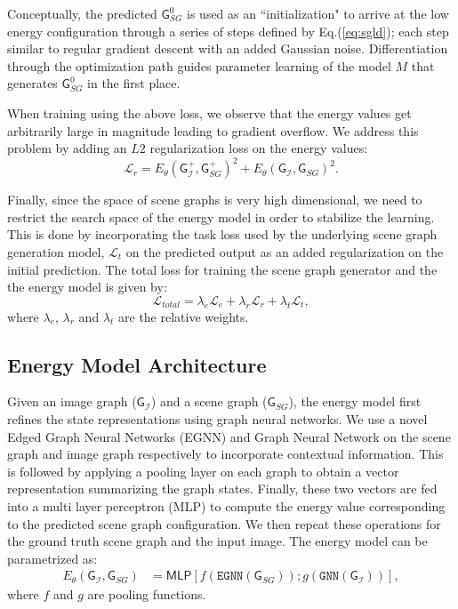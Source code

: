 \documentclass[final]{cvpr}
\newcommand{\imagerep}{\mathcal{I}}
\newcommand{\imagegraph}{$\mathsf{G}_{\imagerep}$}
\newcommand{\imagegrapheq}{\mathsf{G}_{\imagerep}}
\newcommand{\scenegraph}{$\mathsf{G}_{SG}$}
\newcommand{\scenegrapheq}{\mathsf{G}_{SG}}
\begin{document}
Conceptually, the predicted $\scenegrapheq^{0}$ is used as an ``initialization" to arrive at the low energy configuration through a series of steps defined by Eq.(\ref{eq:sgld}); each step similar to regular gradient descent with an added Gaussian noise. Differentiation through the optimization path guides parameter learning of the model $M$ that generates $\scenegrapheq^{0}$ in the first place. 



When training using the above loss, we observe that the energy values get arbitrarily large in magnitude leading to gradient overflow.  We address this problem by adding an $L2$ regularization loss on the energy values:
\begin{equation}
    \mathcal{L}_{r} = E_{\theta}(\imagegrapheq^{+}, \scenegrapheq^{+})^{2} + E_{\theta}(\imagegrapheq, \scenegrapheq)^{2}.
\end{equation}

Finally, since the space of scene graphs is very high dimensional, we need to restrict the search space of the energy model in order to stabilize the learning. This is done by incorporating the task loss used by the underlying scene graph generation model, $\mathcal{L}_{t}$ on the predicted output as an added regularization on the initial prediction. The total loss for training the scene graph generator and the the energy model is given by:
\begin{equation}
    \mathcal{L}_{total} = \lambda_{e}\mathcal{L}_{e} + \lambda_{r}\mathcal{L}_{r} + \lambda_{t}\mathcal{L}_{t},
\end{equation}
where $\lambda_{e}$, $\lambda_{r}$ and $\lambda_{t}$ are the relative weights.  

\subsection{Energy Model Architecture}
\label{sec:energy_model_architecture}
Given an image graph (\imagegraph) and a scene graph (\scenegraph), the energy
model first refines the state representations using graph neural networks. We use a novel Edged Graph Neural Networks (EGNN) and Graph Neural Network \cite{DBLP:journals/corr/LiTBZ15} on the scene graph and image graph respectively to incorporate contextual information. This is followed by applying a pooling layer on each graph to obtain a vector representation summarizing the graph states. Finally, these two vectors are fed into a multi layer perceptron (MLP) to compute the energy value corresponding to the predicted scene graph configuration. We then repeat these operations for the ground truth scene graph and the input image. The energy model can be parametrized as:
\vspace{-0.05in}
\begin{align}
    E_{\theta}(\imagegrapheq, \scenegrapheq) &= \mathsf{MLP} \left[ f(\mathtt{EGNN}(\scenegrapheq)); g(\mathtt{GNN}(\imagegrapheq)) \right],
\end{align}
where $f$ and $g$ are pooling functions.
\end{document}

